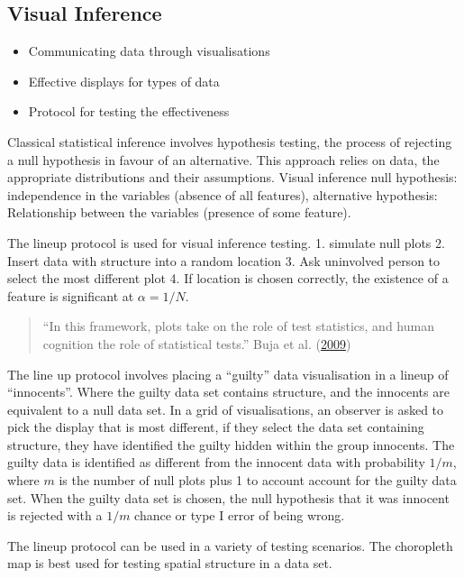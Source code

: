 \documentclass[conference,final,]{IEEEtran}
\providecommand{\tightlist}{%
  \setlength{\itemsep}{0pt}\setlength{\parskip}{0pt}}
\begin{document}
\hypertarget{visual-inference}{%
\subsection{Visual Inference}\label{visual-inference}}

\begin{itemize}
\tightlist
\item
  Communicating data through visualisations
\item
  Effective displays for types of data
\item
  Protocol for testing the effectiveness
\end{itemize}

Classical statistical inference involves hypothesis testing, the process
of rejecting a null hypothesis in favour of an alternative. This
approach relies on data, the appropriate distributions and their
assumptions. Visual inference null hypothesis: independence in the
variables (absence of all features), alternative hypothesis:
Relationship between the variables (presence of some feature).

The lineup protocol is used for visual inference testing. 1. simulate
null plots 2. Insert data with structure into a random location 3. Ask
uninvolved person to select the most different plot 4. If location is
chosen correctly, the existence of a feature is significant at
\(\alpha = 1/N\).

\begin{quote}
``In this framework, plots take on the role of test statistics, and
human cognition the role of statistical tests.'' Buja et al.
(\protect\hyperlink{ref-SIEDAMD}{2009})
\end{quote}

The line up protocol involves placing a ``guilty'' data visualisation in
a lineup of ``innocents''. Where the guilty data set contains structure,
and the innocents are equivalent to a null data set. In a grid of
visualisations, an observer is asked to pick the display that is most
different, if they select the data set containing structure, they have
identified the guilty hidden within the group innocents. The guilty data
is identified as different from the innocent data with probability
\(1/m\), where \(m\) is the number of null plots plus 1 to account
account for the guilty data set. When the guilty data set is chosen, the
null hypothesis that it was innocent is rejected with a \(1/m\) chance
or type I error of being wrong.

The lineup protocol can be used in a variety of testing scenarios. The
choropleth map is best used for testing spatial structure in a data set.
\end{document}
